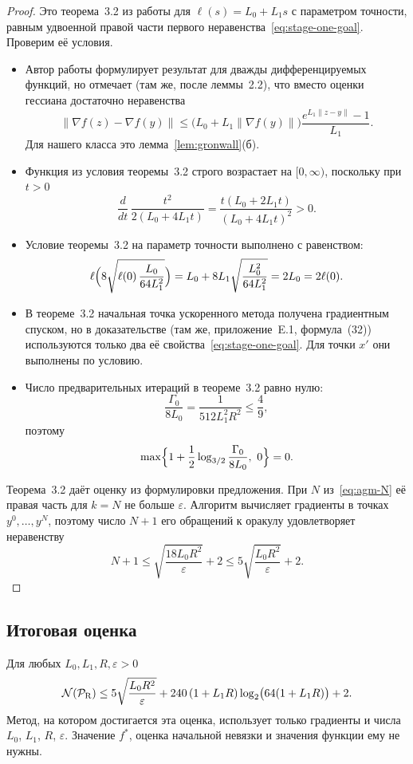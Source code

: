 \documentclass[11pt,a4paper]{article}
\newcommand{\norm}[1]{\|#1\|}
\begin{document}
\begin{proof}
Это теорема~3.2 из работы \citet{tyurin2026accelerated} для $\ell(s)=L_0+L_1s$ с параметром точности, равным удвоенной правой части первого неравенства~\eqref{eq:stage-one-goal}. Проверим её условия.
\begin{itemize}
\item Автор работы \citet{tyurin2026accelerated} формулирует результат для дважды дифференцируемых функций, но отмечает (там же, после леммы~2.2), что вместо оценки гессиана достаточно неравенства
\[
 \norm{\nabla f(z)-\nabla f(y)}\le\bigl(L_0+L_1\norm{\nabla f(y)}\bigr)\frac{e^{L_1\norm{z-y}}-1}{L_1} .
\]
Для нашего класса это лемма~\ref{lem:gronwall}(б).
\item Функция из условия теоремы~3.2 строго возрастает на $[0,\infty)$, поскольку при $t>0$
\[
 \frac{d}{dt}\,\frac{t^2}{2(L_0+4L_1t)}=\frac{t(L_0+2L_1t)}{(L_0+4L_1t)^2}>0 .
\]
\item Условие теоремы~3.2 на параметр точности выполнено с равенством:
\[
 \ell\Bigl(8\sqrt{\ell(0)\,\frac{L_0}{64L_1^2}}\Bigr)=L_0+8L_1\sqrt{\frac{L_0^2}{64L_1^2}}=2L_0=2\ell(0) .
\]
\item В теореме~3.2 начальная точка ускоренного метода получена градиентным спуском, но в доказательстве (там же, приложение~E.1, формула~(32)) используются только два её свойства~\eqref{eq:stage-one-goal}. Для точки $x'$ они выполнены по условию.
\item Число предварительных итераций в теореме~3.2 равно нулю:
\[
 \frac{\Gamma_0}{8L_0}=\frac1{512L_1^2R^2}\le\frac49 ,
\]
поэтому
\[
 \max\Bigl\{1+\frac12\log_{3/2}\frac{\Gamma_0}{8L_0},\ 0\Bigr\}=0 .
\]
\end{itemize}
Теорема~3.2 даёт оценку из формулировки предложения. При $N$ из~\eqref{eq:agm-N} её правая часть для $k=N$ не больше $\varepsilon$. Алгоритм вычисляет градиенты в точках $y^0,\dots,y^N$, поэтому число $N+1$ его обращений к оракулу удовлетворяет неравенству
\[
 N+1\le\sqrt{\frac{18L_0R^2}\varepsilon}+2\le5\sqrt{\frac{L_0R^2}\varepsilon}+2 .
\]
\end{proof}

\subsection{Итоговая оценка}\label{sec:upper-proof}

\begin{theorem}\label{thm:upper}
Для любых $L_0,L_1,R,\varepsilon>0$
\[
 \mathcal N(\mathcal P_{\rm R})\le5\sqrt{\frac{L_0R^2}\varepsilon}+240\,(1+L_1R)\log_2\bigl(64(1+L_1R)\bigr)+2 .
\]
Метод, на котором достигается эта оценка, использует только градиенты и числа $L_0$, $L_1$, $R$, $\varepsilon$. Значение $f^\ast$, оценка начальной невязки и значения функции ему не нужны.
\end{theorem}
\end{document}
